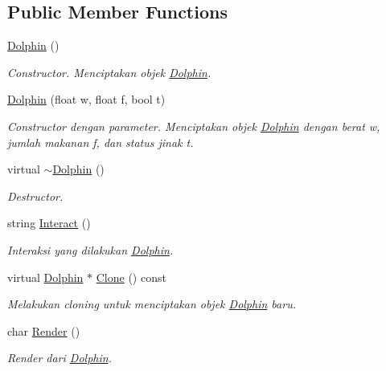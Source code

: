 \subsection*{Public Member Functions}
\begin{DoxyCompactItemize}
\item 
\hyperlink{classDolphin_a571a22b2c3cece5c8175ff49640b35bc}{Dolphin} ()
\begin{DoxyCompactList}\small\item\em Constructor. Menciptakan objek \hyperlink{classDolphin}{Dolphin}. \end{DoxyCompactList}\item 
\hyperlink{classDolphin_a024370cf7beeaef3fbdcdd5fef09e6ef}{Dolphin} (float w, float f, bool t)
\begin{DoxyCompactList}\small\item\em Constructor dengan parameter. Menciptakan objek \hyperlink{classDolphin}{Dolphin} dengan berat w, jumlah makanan f, dan status jinak t. \end{DoxyCompactList}\item 
virtual \hyperlink{classDolphin_a5c11950fe5675f3c36001f20a12343af}{$\sim$\+Dolphin} ()
\begin{DoxyCompactList}\small\item\em Destructor. \end{DoxyCompactList}\item 
string \hyperlink{classDolphin_a592506c38c185d7d383ae755deb9bd72}{Interact} ()
\begin{DoxyCompactList}\small\item\em Interaksi yang dilakukan \hyperlink{classDolphin}{Dolphin}. \end{DoxyCompactList}\item 
virtual \hyperlink{classDolphin}{Dolphin} $\ast$ \hyperlink{classDolphin_a4be3892432206693d2fae815303e07c4}{Clone} () const 
\begin{DoxyCompactList}\small\item\em Melakukan cloning untuk menciptakan objek \hyperlink{classDolphin}{Dolphin} baru. \end{DoxyCompactList}\item 
char \hyperlink{classDolphin_aa051d8ebe93c1c11b503ae76d07cd178}{Render} ()
\begin{DoxyCompactList}\small\item\em Render dari \hyperlink{classDolphin}{Dolphin}. \end{DoxyCompactList}\end{DoxyCompactItemize}
